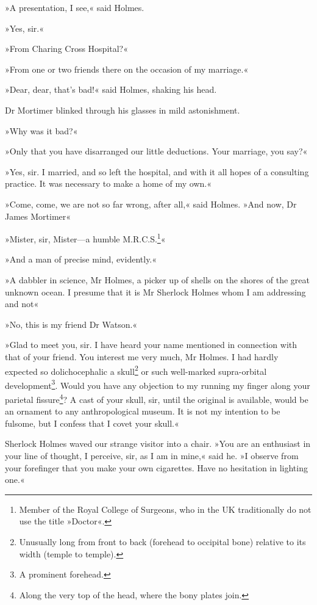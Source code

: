 »A presentation, I see,« said Holmes.

»Yes, sir.«

»From Charing Cross Hospital?«

»From one or two friends there on the occasion of my marriage.«

»Dear, dear, that's bad!« said Holmes, shaking his head.

Dr Mortimer blinked through his glasses in mild astonishment.

»Why was it bad?«

»Only that you have disarranged our little deductions. Your marriage, you say?«

»Yes, sir. I married, and so left the hospital, and with it all hopes of a consulting practice. It was necessary to make a home of my own.«

»Come, come, we are not so far wrong, after all,« said Holmes. »And now, Dr James Mortimer\longdash«

»Mister, sir, Mister—a humble M.R.C.S.\footnote{Member of the Royal College of Surgeons, who in the UK traditionally do not use the title »Doctor«.}«

»And a man of precise mind, evidently.«

»A dabbler in science, Mr Holmes, a picker up of shells on the shores of the great unknown ocean. I presume that it is Mr Sherlock Holmes whom I am addressing and not\longdash«

»No, this is my friend Dr Watson.«

»Glad to meet you, sir. I have heard your name mentioned in connection with that of your friend. You interest me very much, Mr Holmes. I had hardly expected so dolichocephalic a skull\footnote{Unusually long from front to back (forehead to occipital bone) relative to its width (temple to temple).} or such well-marked supra-orbital development\footnote{A prominent forehead.}. Would you have any objection to my running my finger along your parietal fissure\footnote{Along the very top of the head, where the bony plates join.}? A cast of your skull, sir, until the original is available, would be an ornament to any anthropological museum. It is not my intention to be fulsome, but I confess that I covet your skull.«

Sherlock Holmes waved our strange visitor into a chair. »You are an enthusiast in your line of thought, I perceive, sir, as I am in mine,« said he. »I observe from your forefinger that you make your own cigarettes. Have no hesitation in lighting one.«


